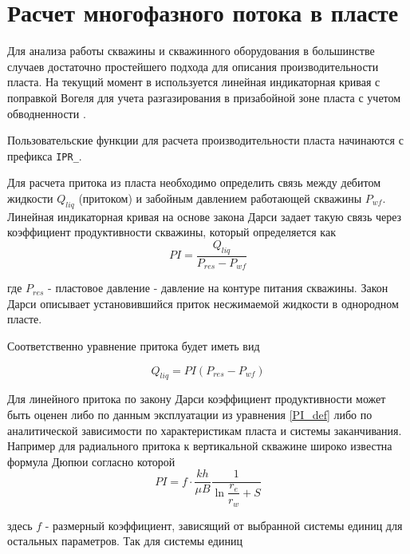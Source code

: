
\section{Расчет многофазного потока в пласте}
Для анализа работы скважины и скважинного оборудования в большинстве случаев достаточно простейшего подхода для описания производительности пласта. На текущий момент в \unf{} используется линейная индикаторная кривая с поправкой Вогеля для учета разгазирования в призабойной зоне пласта с учетом обводненности \cite{KBrown_AL_methods_vol4}. 

Пользовательские функции для расчета производительности пласта начинаются с префикса  \texttt{IPR_}. 

Для расчета притока из пласта необходимо определить связь между дебитом жидкости $Q_{liq}$ (притоком) и забойным давлением работающей скважины $P_{wf}$.
Линейная индикаторная кривая на основе закона Дарси задает такую связь через коэффициент продуктивности скважины, который определяется как 
\begin{equation}\label{PI_def} 
 PI = \frac{Q_{liq}}{P_{res} - P_{wf}} 
\end{equation}

где $P_{res}$ - пластовое давление - давление на контуре питания скважины. Закон Дарси описывает установившийся приток несжимаемой жидкости в однородном пласте. 

Соответственно уравнение притока будет иметь вид

$$ Q_{liq} = PI \left( P_{res} - P_{wf} \right) $$

Для линейного притока по закону Дарси коэффициент продуктивности может быть оценен либо по данным эксплуатации из уравнения \ref{PI_def} либо по аналитической зависимости по характеристикам пласта и системы заканчивания. Например для радиального притока к вертикальной скважине широко известна формула Дюпюи согласно которой 
\begin{equation}\label{eq_Dupui} 
PI = f \cdot \frac{kh}{\mu B}\frac{1}{ \ln \dfrac{r_e}{r_w} + S }  
\end{equation}

здесь $f$ - размерный коэффициент, зависящий от выбранной системы единиц для остальных параметров. Так для системы единиц

\newcommand{\rnttab}[1]{
	\begin{tabular}[c]{@{}c@{}}#1\end{tabular}	
}

